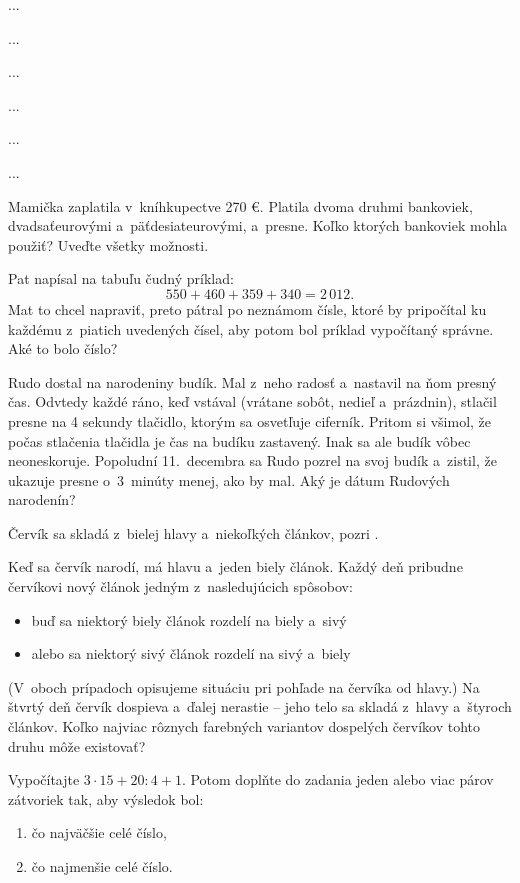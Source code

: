 ﻿{%
...}

{%
...}

{%
...}

{%
...}

{%
...}

{%
...}

{%
Mamička zaplatila v~kníhkupectve 270 €.
Platila dvoma druhmi bankoviek, dvadsaťeurovými a~päťdesiateurovými, a~presne.
Koľko ktorých bankoviek mohla použiť? Uveďte všetky možnosti.}

{%
Pat napísal na tabuľu čudný príklad:
$$
  550+460+359+340=2\,012.
$$
Mat to chcel napraviť, preto pátral po neznámom čísle, ktoré by pripočítal ku
každému z~piatich uvedených čísel, aby potom bol príklad vypočítaný správne.
Aké to bolo číslo?}

{%
Rudo dostal na narodeniny budík. Mal z~neho radosť a~nastavil na ňom presný čas.
Odvtedy každé ráno, keď vstával (vrátane sobôt, nedieľ a~prázdnin), stlačil presne na 4 sekundy tlačidlo, ktorým sa osvetľuje
ciferník. Pritom si všimol, že počas stlačenia tlačidla je čas na budíku
zastavený. Inak sa ale budík vôbec neoneskoruje. Popoludní 11.~decembra sa
Rudo pozrel na svoj budík a~zistil, že ukazuje presne o~3~minúty menej, ako
by mal. Aký je dátum Rudových narodenín?}

{%
Červík sa skladá z~bielej hlavy a~niekoľkých článkov, pozri \obr.
%

\noindent
Keď sa červík narodí, má hlavu a~jeden biely článok.
Každý deň pribudne červíkovi nový článok jedným z~nasledujúcich spôsobov:
\begin{itemize}
  \item buď sa niektorý biely článok rozdelí na biely a~sivý
  \item alebo sa niektorý sivý článok rozdelí na sivý a~biely
\end{itemize}
\noindent
(V~oboch prípadoch opisujeme situáciu pri pohľade na červíka od hlavy.)
Na štvrtý deň červík dospieva a~ďalej nerastie -- jeho telo sa skladá z~hlavy
a~štyroch článkov. Koľko najviac rôznych farebných variantov dospelých červíkov tohto druhu môže existovať?}

{%
Vypočítajte $3\cdot 15+20:4+1$. Potom doplňte do zadania jeden alebo viac párov zátvoriek tak, aby výsledok bol:
\begin{enumerate}
  \item čo najväčšie celé číslo,
  \item čo najmenšie celé číslo.
\end{enumerate}
}

